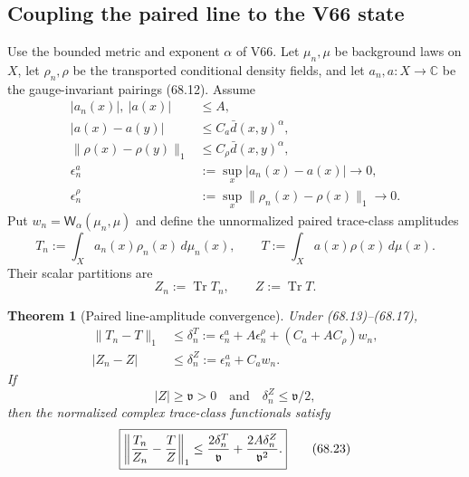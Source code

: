 \documentclass[11pt]{article}
\newtheorem{theorem}{Theorem}[section]
\theoremstyle{remark}
\begin{document}
\subsection{Coupling the paired line to the V66 state}

Use the bounded metric and exponent \(\alpha\) of V66.  Let
\(\mu_n,\mu\) be background laws on \(X\), let
\(\rho_n,\rho\) be the transported conditional density fields, and
let \(a_n,a:X\to\mathbb C\) be the gauge-invariant pairings
(68.12).  Assume
\begin{align}
 |a_n(x)|,\ |a(x)|&\leq A,                        \tag{68.13}\\
 |a(x)-a(y)|&\leq C_a\bar d(x,y)^\alpha,          \tag{68.14}\\
 \|\rho(x)-\rho(y)\|_1
 &\leq C_\rho\bar d(x,y)^\alpha,                  \tag{68.15}\\
 \epsilon_n^a&:=\sup_x|a_n(x)-a(x)|\to0,           \tag{68.16}\\
 \epsilon_n^\rho&:=\sup_x\|\rho_n(x)-\rho(x)\|_1\to0.          \tag{68.17}
\end{align}
Put \(w_n={\mathsf W}_\alpha(\mu_n,\mu)\) and define the unnormalized
paired trace-class amplitudes
\begin{equation}
 T_n:=\int_X a_n(x)\rho_n(x)\,d\mu_n(x),
 \qquad
 T:=\int_X a(x)\rho(x)\,d\mu(x).                   \tag{68.18}
\end{equation}
Their scalar partitions are
\begin{equation}
                         Z_n:=\operatorname{Tr}T_n,\qquad
 Z:=\operatorname{Tr}T.                           \tag{68.19}
\end{equation}

\begin{theorem}[Paired line-amplitude convergence]
\label{thm:v12v68-paired}
Under (68.13)--(68.17),
\begin{align}
 \|T_n-T\|_1
 &\leq
 \delta_n^T
 :=
 \epsilon_n^a+A\epsilon_n^\rho
 +(C_a+AC_\rho)w_n,                               \tag{68.20}\\
 |Z_n-Z|
 &\leq
 \delta_n^Z
 :=
 \epsilon_n^a+C_aw_n.                             \tag{68.21}
\end{align}
If
\begin{equation}
                         |Z|\geq\mathfrak v>0
 \quad\text{and}\quad
 \delta_n^Z\leq\mathfrak v/2,                     \tag{68.22}
\end{equation}
then the normalized complex trace-class functionals satisfy
\begin{equation}
 \boxed{
 \left\|{T_n\over Z_n}-{T\over Z}\right\|_1
 \leq
 {2\delta_n^T\over\mathfrak v}
 +
 {2A\delta_n^Z\over\mathfrak v^2}.}               \tag{68.23}
\end{equation}
\end{theorem}
\end{document}
